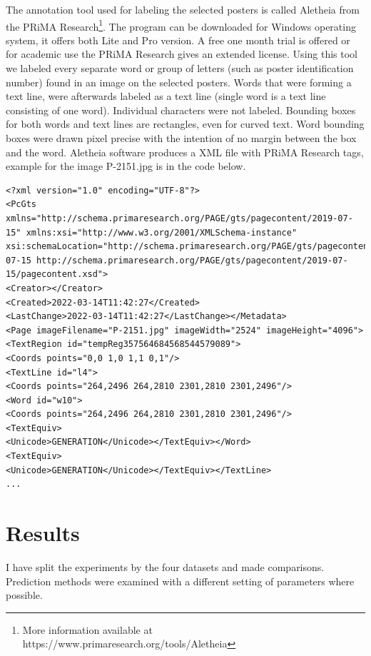 The annotation tool used for labeling the selected posters is called Aletheia from the PRiMA Research\footnote{More information available at https://www.primaresearch.org/tools/Aletheia}. The program can be downloaded for Windows operating system, it offers both Lite and Pro version. A free one month trial is offered or for academic use the PRiMA Research gives an extended license. Using this tool we labeled every separate word or group of letters (such as poster identification number) found in an image on the selected posters. Words that were forming a text line, were afterwards labeled as a text line (single word is a text line consisting of one word). Individual characters were not labeled. Bounding boxes for both words and text lines are rectangles, even for curved text. Word bounding boxes were drawn pixel precise with the intention of no margin between the box and the word. Aletheia software produces a XML file with PRiMA Research tags, example for the image P-2151.jpg is in the code below. 

\begin{lstlisting}[label=lst:xml]
<?xml version="1.0" encoding="UTF-8"?>
<PcGts xmlns="http://schema.primaresearch.org/PAGE/gts/pagecontent/2019-07-15" xmlns:xsi="http://www.w3.org/2001/XMLSchema-instance" xsi:schemaLocation="http://schema.primaresearch.org/PAGE/gts/pagecontent/2019-07-15 http://schema.primaresearch.org/PAGE/gts/pagecontent/2019-07-15/pagecontent.xsd">
<Creator></Creator>
<Created>2022-03-14T11:42:27</Created>
<LastChange>2022-03-14T11:42:27</LastChange></Metadata>
<Page imageFilename="P-2151.jpg" imageWidth="2524" imageHeight="4096">
<TextRegion id="tempReg357564684568544579089">
<Coords points="0,0 1,0 1,1 0,1"/>
<TextLine id="l4">
<Coords points="264,2496 264,2810 2301,2810 2301,2496"/>
<Word id="w10">
<Coords points="264,2496 264,2810 2301,2810 2301,2496"/>
<TextEquiv>
<Unicode>GENERATION</Unicode></TextEquiv></Word>
<TextEquiv>
<Unicode>GENERATION</Unicode></TextEquiv></TextLine>
...
\end{lstlisting}









\section{Results}



I have split the experiments by the four datasets and made comparisons. Prediction methods were examined with a different setting of parameters where possible.

